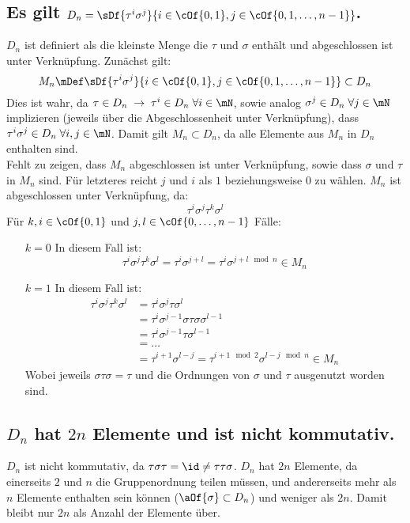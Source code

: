 \subsection{Es gilt $D_n = \sDf{\tau^i\sigma^j}{i\in\cOf{0,1}, j\in\cOf{0,1,\dots,n-1}}$.}
$D_n$ ist definiert als die kleinste Menge die $\tau$ und $\sigma$ enthält und abgeschlossen ist unter Verknüpfung. Zunächst gilt:
\begin{equation}
	M_n \mDef \sDf{\tau^i\sigma^j}{i\in\cOf{0,1}, j\in\cOf{0,1,\dots,n-1}} \subset D_n
\end{equation}
Dies ist wahr, da $\tau\in D_n\;\rightarrow\;\tau^i\in D_n\;\forall i \in \mN$, sowie analog $\sigma^j\in D_n\;\forall j \in \mN$ implizieren (jeweils über die Abgeschlossenheit unter Verknüpfung), dass $\tau^i\sigma^j\in D_n\;\forall i,j\in\mN$. Damit gilt $M_n \subset D_n$, da alle Elemente aus $M_n$ in $D_n$ enthalten sind.\\
Fehlt zu zeigen, dass $M_n$ abgeschlossen ist unter Verknüpfung, sowie dass $\sigma$ und $\tau$ in $M_n$ sind. Für letzteres reicht $j$ und $i$ als $1$ beziehungsweise $0$ zu wählen. $M_n$ ist abgeschlossen unter Verknüpfung, da:
\begin{equation}
	\tau^i\sigma^j\tau^k\sigma^l
\end{equation}
Für $k,i\in\cOf{0,1}$ und $j,l\in\cOf{0,\dots,n-1}$ Fälle:
\begin{enumerate}
	\item[$k=0$] In diesem Fall ist:
	\begin{equation}
		\tau^i\sigma^j\tau^k\sigma^l = \tau^i\sigma^{j+l} = \tau^i\sigma^{j+l \mod n} \in M_n
	\end{equation}
	\item[$k=1$] In diesem Fall ist:
	\begin{align}
		\tau^i\sigma^j\tau^k\sigma^l & = \tau^i\sigma^j\tau\sigma^l\\
		& = \tau^i\sigma^{j-1}\sigma\tau\sigma\sigma^{l-1}\\
		& = \tau^i\sigma^{j-1}\tau\sigma^{l-1}\\
		& = \dots \\
		& = \tau^{i+1}\sigma^{l-j} = \tau^{i+1\!\mod 2}\sigma^{l-j\!\mod n} \in M_n
	\end{align}
	Wobei jeweils $\sigma\tau\sigma = \tau$ und die Ordnungen von $\sigma$ und $\tau$ ausgenutzt worden sind.
\end{enumerate}

\subsection{$D_n$ hat $2n$ Elemente und ist nicht kommutativ.}
$D_n$ ist nicht kommutativ, da $\tau\sigma\tau = \id \neq \tau\tau\sigma$. $D_n$ hat $2n$ Elemente, da einerseits $2$ und $n$ die Gruppenordnung teilen müssen, und andererseits mehr als $n$ Elemente enthalten sein können ($\aOf{\sigma} \subset D_n$) und weniger als $2n$. Damit bleibt nur $2n$ als Anzahl der Elemente über.
